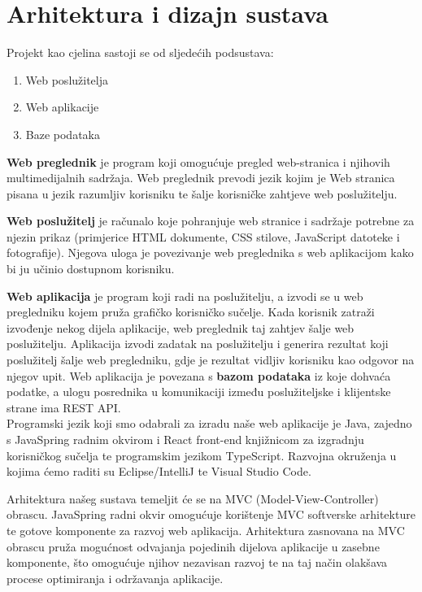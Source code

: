\chapter{Arhitektura i dizajn sustava}
		
		Projekt kao cjelina sastoji se od sljedećih podsustava:
		
		\begin{enumerate}
			\item  Web poslužitelja
			
			\item  Web aplikacije
			
			\item  Baze podataka
			
		\end{enumerate}
	
		\textbf{Web preglednik} je program koji omogućuje pregled web-stranica i njihovih multimedijalnih sadržaja. Web preglednik prevodi jezik kojim je Web stranica pisana u jezik razumljiv korisniku te šalje korisničke zahtjeve web poslužitelju.
		
		\textbf{Web poslužitelj} je računalo koje pohranjuje web stranice i sadržaje potrebne za njezin prikaz (primjerice HTML dokumente, CSS stilove, JavaScript datoteke i fotografije). Njegova uloga je povezivanje web preglednika s web aplikacijom kako bi ju učinio dostupnom korisniku.
		
		\textbf{Web aplikacija} je program koji radi na poslužitelju, a izvodi se u web pregledniku kojem pruža grafičko korisničko sučelje. Kada korisnik zatraži izvođenje nekog dijela aplikacije, web preglednik taj zahtjev šalje web poslužitelju. Aplikacija izvodi zadatak na poslužitelju i generira rezultat koji poslužitelj šalje web pregledniku, gdje je rezultat vidljiv korisniku kao odgovor na njegov upit. Web aplikacija je povezana s \textbf{bazom podataka} iz koje dohvaća podatke, a ulogu posrednika u komunikaciji između poslužiteljske i klijentske strane ima REST API.\\
		
		
			
		Programski jezik koji smo odabrali za izradu naše web aplikacije je Java, zajedno s JavaSpring radnim okvirom i React front-end knjižnicom za izgradnju korisničkog sučelja te programskim jezikom TypeScript. Razvojna okruženja u kojima ćemo raditi su Eclipse/IntelliJ te Visual Studio Code.
		
			
		Arhitektura našeg sustava temeljit će se na MVC (Model-View-Controller) obrascu. JavaSpring radni okvir omogućuje korištenje MVC softverske arhitekture te gotove komponente za razvoj web aplikacija. Arhitektura zasnovana na MVC obrascu pruža mogućnost odvajanja pojedinih dijelova aplikacije u zasebne komponente, što omogućuje njihov nezavisan razvoj te na taj način olakšava procese optimiranja i održavanja aplikacije.\\\\
		
